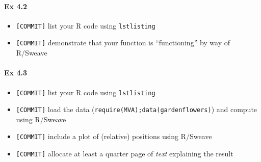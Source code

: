 \documentclass[12pt]{article}
\begin{document}
\paragraph{Ex 4.2}
\begin{itemize}
    \item \verb+[COMMIT]+ list your R code using \verb+lstlisting+ 
    \item \verb+[COMMIT]+ demonstrate that your function is ``functioning'' by way of R/Sweave
\end{itemize}

\paragraph{Ex 4.3}
\begin{itemize}
    \item \verb+[COMMIT]+ list your R code using \verb+lstlisting+ 
    \item \verb+[COMMIT]+ load the data
        (\verb+require(MVA);data(gardenflowers)+) and compute using R/Sweave
    \item \verb+[COMMIT]+ include a plot of (relative) positions using R/Sweave
    \item \verb+[COMMIT]+ allocate at least a quarter page of \emph{text} explaining the result
\end{itemize}


\nocite{*}

\end{document}
